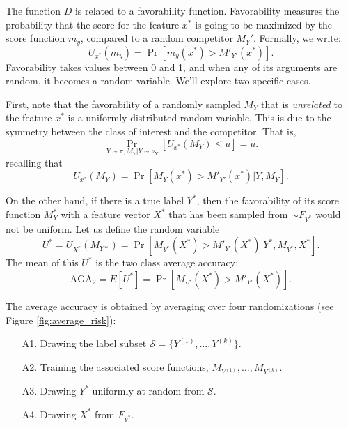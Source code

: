 \documentclass[12pt]{article}
\begin{document}
The function $\bar{D}$ is related to a favorability function. Favorability measures the probability that the score for 
the feature $x^*$ is going to be maximized by the score function $m_y$, compared to a random competitor $M_Y'$. 
Formally, we write:
\begin{equation}\label{eq:U_function}
U_{x^*}(m_{y}) = \Pr[m_{y}(x^*) > M'_{Y'}(x^*)].
\end{equation}
Favorability takes values between 0 and 1, and when any of its arguments are random,
it becomes a random variable. We'll explore two specific cases. 

First, note that the favorability of a randomly sampled $M_Y$ that is \emph{unrelated} to the feature $x^*$
is a uniformly distributed random variable. This is due to the symmetry between 
the class of interest and the competitor. 
That is,
\begin{equation}\label{eq:Uniform}
\Pr_{Y\sim \pi, M_{Y}|Y \sim \nu_{Y}}[U_{x^*}(M_Y) \leq u] = u.
\end{equation}
recalling that
\begin{equation}
U_{x^*}(M_Y) = \Pr[M_{Y}(x^*) > M'_{Y'}(x^*)|Y,M_{Y}].
\end{equation}

On the other hand, if there is a true label $Y^*$,
then the favorability of its score function $M_Y^*$ with a feature vector $X^*$ that 
has been sampled from $\sim F_{Y^*}$ would not be uniform.
Let us define the random variable 
\begin{equation}
U^* = U_{X^*}(M_{Y*}) = \Pr[M_{Y^*}(X^*) > M'_{Y'}(X^*)|Y^*,M_{Y^*},X^*].
\end{equation}
The mean of this $U^*$ is the two class average accuracy: 
\[\text{AGA}_2 = E[U^*] = \Pr[M_{Y^*}(X^*) > M'_{Y'}(X^*)]. \]



The average accuracy is
obtained by averaging over four randomizations (see Figure \ref{fig:average_risk}):
\begin{enumerate}
\item[A1.] Drawing the label subset $\mathcal{S}=\{Y^{(1)},\hdots,Y^{(k)}\}$.
\item[A2.] Training the associated score functions, $M_{Y^{(1)}},\hdots, M_{Y^{(k)}}.$
\item[A3.] Drawing $Y^*$ uniformly at random from $\mathcal{S}$.
\item[A4.] Drawing $X^*$ from $F_{Y^*}$.
\end{enumerate}
\end{document}
